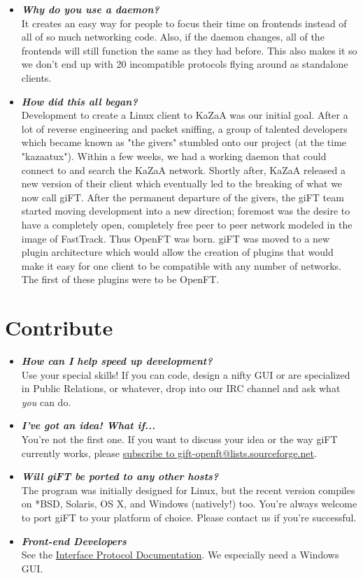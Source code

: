 \documentclass[10pt]{article}
\newcommand{\question}[1]{\item\textbf{\emph{#1}}}
\begin{document}
\begin{itemize}
\question {Why do you use a daemon?}\\
It creates an easy way for people to focus their time on frontends instead of
all of so much networking code. Also, if the daemon changes, all of the
frontends will still function the same as they had before. This also makes it
so we don't end up with 20 incompatible protocols flying around as standalone
clients.

\question {How did this all began?}\\
Development to create a Linux client to KaZaA was our initial goal. After a lot
of reverse engineering and packet sniffing, a group of talented developers
which became known as "the givers" stumbled onto our project (at the time
"kazaatux"). Within a few weeks, we had a working daemon that could connect
to and search the KaZaA network. Shortly after, KaZaA released a new version of
their client which eventually led to the breaking of what we now call giFT.
After the permanent departure of the givers, the giFT team started moving
development into a new direction; foremost was the desire to have a completely
open, completely free peer to peer network modeled in the image of FastTrack.
Thus OpenFT was born. giFT was moved to a new plugin architecture which would
allow the creation of plugins that would make it easy for one client to be
compatible with any number of networks. The first of these plugins were to be
OpenFT. 

\end{itemize}

\section{Contribute}
\begin{itemize}

\question {How can I help speed up development?}\\
Use your special skills! If you can code, design a nifty GUI or are specialized
in Public Relations, or whatever, drop into our IRC channel and ask what
\emph{you} can do.

\question {I've got an idea! What if...}\\
You're not the first one. If you want to discuss your idea or the way giFT
currently works, please
\href{http://lists.sourceforge.net/lists/listinfo/gift-openft}{subscribe to
gift-openft@lists.sourceforge.net}.
 
\question {Will giFT be ported to any other hosts?}\\
The program was initially designed for Linux, but the recent version compiles
on *BSD, Solaris, OS X, and Windows (natively!) too. You're always welcome to
port giFT to your platform of choice. Please contact us if you're successful. 
 
\question {Front-end Developers}\\
See the
\href{http://gift.sourceforge.net/docs/?document=interface.html}{Interface
Protocol Documentation}. We especially need a Windows GUI. 

\end{itemize}
 
\end{document}
